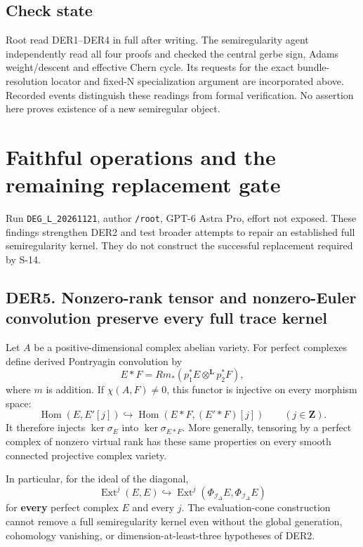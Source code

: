 \documentclass[11pt,a4paper]{article}
\theoremstyle{definition}
\begin{document}
\subsection{Check state}\label{check-state}

Root read DER1--DER4 in full after writing. The semiregularity agent
independently read all four proofs and checked the central gerbe sign,
Adams weight/descent and effective Chern cycle. Its requests for the
exact bundle-resolution locator and fixed-N specialization argument are
incorporated above. Recorded events distinguish these readings from
formal verification. No assertion here proves existence of a new
semiregular object.

\section{Faithful operations and the remaining replacement gate}

Run \texttt{DEG\_L\_20261121}, author \texttt{/root}, GPT-6 Astra Pro,
effort not exposed. These findings strengthen DER2 and test broader
attempts to repair an established full semiregularity kernel. They do
not construct the successful replacement required by S-14.

\subsection{DER5. Nonzero-rank tensor and nonzero-Euler convolution
preserve every full trace
kernel}\label{der5.-nonzero-rank-tensor-and-nonzero-euler-convolution-preserve-every-full-trace-kernel}

Let \(A\) be a positive-dimensional complex abelian variety. For perfect
complexes define derived Pontryagin convolution by \[
 E*F=Rm_*(p_1^*E\otimes^{\mathbf L}p_2^*F),
\] where \(m\) is addition. If \(\chi(A,F)\ne0\), this functor is
injective on every morphism space: \[
 \operatorname{Hom}(E,E'[j])\hookrightarrow
 \operatorname{Hom}(E*F,(E'*F)[j])\qquad(j\in\mathbf Z).
\tag{DER5a}
\] It therefore injects \(\ker\sigma_E\) into \(\ker\sigma_{E*F}\). More
generally, tensoring by a perfect complex of nonzero virtual rank has
these same properties on every smooth connected projective complex
variety.

In particular, for the ideal of the diagonal, \[
 \operatorname{Ext}^j(E,E)\hookrightarrow
 \operatorname{Ext}^j(\Phi_{\mathcal I_\Delta}E,
                         \Phi_{\mathcal I_\Delta}E)
\tag{DER5b}
\] for \textbf{every} perfect complex \(E\) and every \(j\). The
evaluation-cone construction cannot remove a full semiregularity kernel
even without the global generation, cohomology vanishing, or
dimension-at-least-three hypotheses of DER2.
\end{document}

